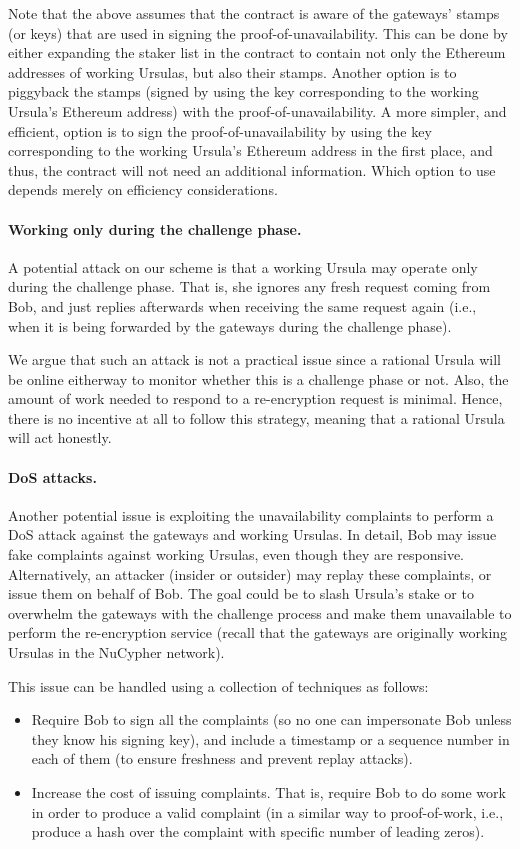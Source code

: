 Note that the above assumes that the \stakeescrow contract is aware of the gateways' stamps (or keys) that are used in signing the proof-of-unavailability. This can be done by either expanding the staker list in the contract to contain not only the Ethereum addresses of working Ursulas, but also their stamps. Another option is to piggyback the stamps (signed by using the key corresponding to the working Ursula's Ethereum address) with the proof-of-unavailability. A more simpler, and efficient, option is to sign the proof-of-unavailability by using the key corresponding to the working Ursula's Ethereum address in the first place, and thus, the \stakeescrow contract will not need an additional information. Which option to use depends merely on efficiency considerations.


\paragraph{\bf Working only during the challenge phase.}
A potential attack on our scheme is that a working Ursula may operate only during the challenge phase. That is, she ignores any fresh request coming from Bob, and just replies afterwards when receiving the same request again (i.e., when it is being forwarded by the gateways during the challenge phase). 


We argue that such an attack is not a practical issue since a rational Ursula will be online eitherway to monitor whether this is a challenge phase or not. Also, the amount of work needed to respond to a re-encryption request is minimal. Hence, there is no incentive at all to follow this strategy, meaning that a rational Ursula will act honestly.


\paragraph{\bf DoS attacks.} 
Another potential issue is exploiting the unavailability complaints to perform a DoS attack against the gateways and working Ursulas. In detail, Bob may issue fake complaints against working Ursulas, even though they are responsive. Alternatively, an attacker (insider or outsider) may replay these complaints, or issue them on behalf of Bob. The goal could be to slash Ursula's stake or to overwhelm the gateways with the challenge process and make them unavailable to perform the re-encryption service (recall that the gateways are originally working Ursulas in the NuCypher network).


This issue can be handled using a collection of techniques as follows:
\begin{itemize}
\item Require Bob to sign all the complaints (so no one can impersonate Bob unless they know his signing key), and include a timestamp or a sequence number in each of them (to ensure freshness and prevent replay attacks).

\item Increase the cost of issuing complaints. That is, require Bob to do some work in order to produce a valid complaint (in a similar way to proof-of-work, i.e., produce a hash over the complaint with specific number of leading zeros).
\end{itemize}



